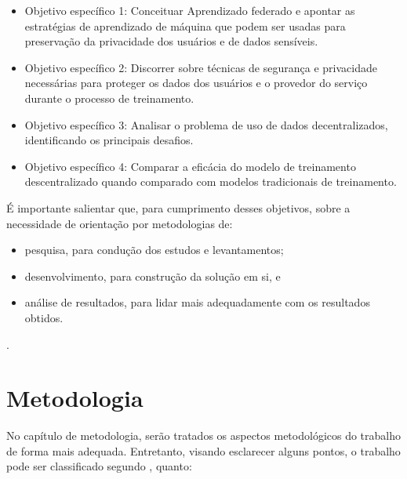 \begin{itemize}
    \item Objetivo específico 1: Conceituar Aprendizado federado e apontar as estratégias de aprendizado de máquina que podem ser usadas para preservação da privacidade dos usuários e de dados sensíveis.
    \item Objetivo específico 2: Discorrer sobre técnicas de segurança e privacidade necessárias para proteger os dados dos usuários e o provedor do serviço durante o processo de treinamento.
    \item Objetivo específico 3: Analisar o problema de uso de dados decentralizados, identificando os principais desafios.
    \item Objetivo específico 4: Comparar a eficácia do modelo de treinamento descentralizado quando comparado com modelos tradicionais de treinamento.
\end{itemize}

É importante salientar que, para cumprimento desses objetivos, sobre a necessidade de orientação por metodologias de:
\begin{itemize}
    \item pesquisa, para condução dos estudos e levantamentos;
    \item desenvolvimento, para construção da solução em si, e
    \item análise de resultados, para lidar mais adequadamente com os resultados obtidos.
\end{itemize}
.

\section{Metodologia}
\label{sec:metodologia}

No capítulo de metodologia, serão tratados os aspectos metodológicos do trabalho de forma mais adequada. Entretanto, visando esclarecer alguns pontos, o trabalho pode ser classificado segundo \cite{GIL}, quanto:

